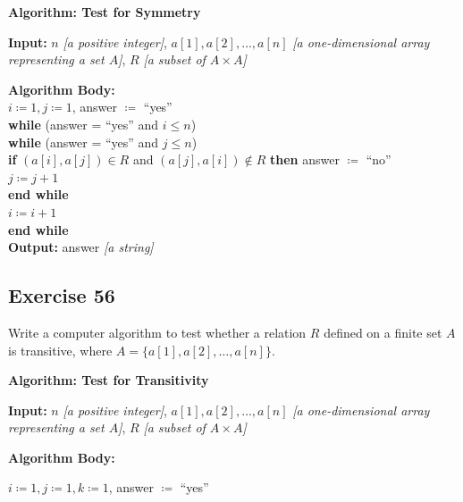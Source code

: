 \documentclass[14pt]{extarticle}
\newcommand{\cy}{\color{cyan}}
\begin{document}
\begin{tcolorbox}[colframe=cyan]
        {\bf \cy Algorithm: Test for Symmetry}

        {\bf Input:} $n$ {\it [a positive integer]}, \(a[1], a[2], \ldots, a[n]\) {\it [a one-dimensional array representing a set $A$]}, $R$ {\it [a subset of \(A \times A\)]}

        \begin{tabbing}
                {\bf Alg}\={\bf orithm Body:} \\
                \> \(i \coloneqq 1, j \coloneqq 1\), answer $\coloneqq$ ``yes''\\
                \> {\bf whi}\= {\bf le} (answer = ``yes'' and \(i \leq n\)) \\
                \>          \> {\bf whi}\={\bf le} (answer = ``yes'' and \(j \leq n\)) \\
                \>          \>           \> {\bf if} \((a[i], a[j]) \in R\) and \((a[j], a[i]) \notin R\) {\bf then}
                answer \(\coloneqq\) ``no'' \\
                \>          \>           \> \(j \coloneqq j+1\) \\
                \>          \> {\bf end while} \\
                \>          \>  \(i \coloneqq i+1\) \\
                \> {\bf end while} \\
                {\bf Output:} answer {\it [a string]}
        \end{tabbing}
\end{tcolorbox}

\subsection{Exercise 56}
Write a computer algorithm to test whether a relation \(R\) defined on a finite set \(A\) is transitive, where
\(A = \{a[1], a[2], \ldots, a[n]\}\).

\begin{tcolorbox}[colframe=cyan]
        {\bf \cy Algorithm: Test for Transitivity}

        {\bf Input:} $n$ {\it [a positive integer]}, \(a[1], a[2], \ldots, a[n]\) {\it [a one-dimensional array representing a set $A$]}, $R$ {\it [a subset of \(A \times A\)]}

                {\bf Algorithm Body:}

        \(i \coloneqq 1, j \coloneqq 1, k \coloneqq 1\), answer $\coloneqq$ ``yes''
\end{tcolorbox}
\end{document}
